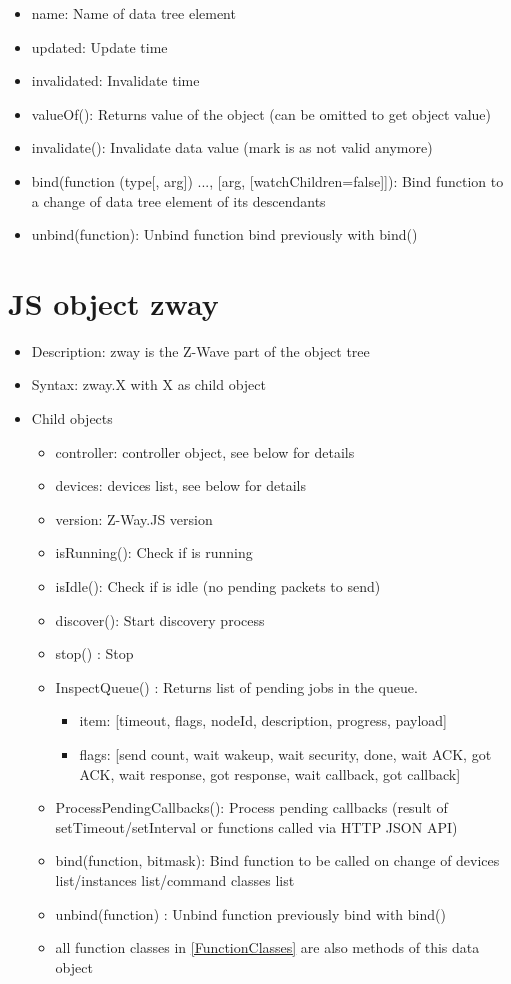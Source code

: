 \begin {itemize}
\item name: Name of data tree element
\item updated: Update time
\item invalidated: Invalidate time
\item valueOf(): Returns value of the object (can be omitted to get object value)
\item invalidate(): Invalidate data value (mark is as not valid anymore)
\item bind(function (type[, arg]) {...}, [arg, [watchChildren=false]]): Bind function 
to a change of data tree element of its descendants
\item unbind(function): Unbind function bind previously with bind()
\end {itemize}


\section{JS object zway}

\begin {itemize}
\item Description: zway is the Z-Wave part of the object tree
\item Syntax:  zway.X with  X as child object
\item Child objects
\begin {itemize}
\item controller: controller object, see below for details
\item devices: devices list, see below for details
\item version: Z-Way.JS version
\item isRunning(): Check if \zway is running
\item isIdle(): Check if \zway is idle (no pending packets to send)
\item discover(): Start \zway discovery process
\item stop() : Stop \zway
\item InspectQueue() : Returns list of pending jobs in the queue.
\begin {itemize}
\item item: [timeout, flags, nodeId, description, progress, payload]
\item flags: [send count, wait wakeup, wait security, done, wait ACK, got ACK, wait response, got response, wait callback, got callback]
\end {itemize}
\item ProcessPendingCallbacks(): Process pending callbacks (result of setTimeout/setInterval or functions called via HTTP JSON API)
\item bind(function, bitmask): Bind function to be called on change of devices list/instances list/command classes list
\item unbind(function) : Unbind function previously bind with bind()
\item all function classes in \ref{FunctionClasses} are also methods of this data object
\end {itemize}
\end {itemize}

